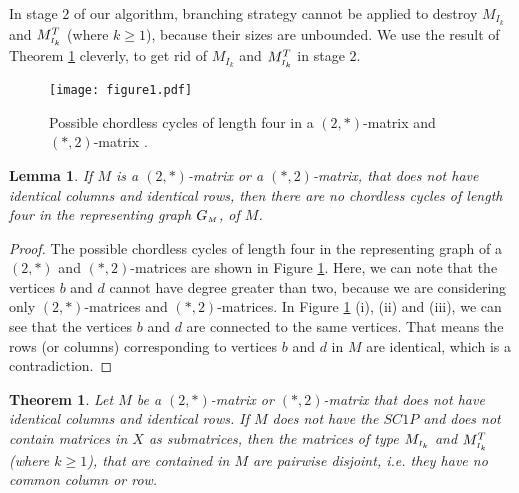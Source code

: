 \documentclass[review, 1p]{elsarticle}
\newtheorem{theorem}{Theorem}
\newtheorem{lemma}{Lemma}
\begin{document}
In stage $2$ of our algorithm, branching strategy cannot be applied to destroy $M_{I_{k}}$ and $M^{T}_{\mathsmaller{I_{k}}}$ (where $k \geq 1$), because their sizes are unbounded. We use the result of Theorem \ref{main} cleverly, to get rid of $M_{I_{k}}$ and $M^{T}_{\mathsmaller{I_{k}}}$ in stage $2$. 
\begin{figure}[t]
\centering
 \texttt{[image: figure1.pdf]}
  \caption{Possible chordless cycles of length four in a $(2,*)$-matrix and $(*,2)$-matrix .\label{chrd}}
\end{figure}
\begin{lemma}\label{chrdl}
If $M$ is a $(2,*)$-matrix or a  $(*,2)$-matrix, that does not have identical columns and identical rows, then there are no chordless cycles of length four in the representing graph $G_{\mathsmaller{M}}$, of $M$.
\end{lemma}
 \begin{proof}
 The possible chordless cycles of length four in the representing graph of a $(2,*)$ and $(*,2)$-matrices are shown in Figure \ref{chrd}. Here, we can note that the vertices $b$ and $d$ cannot have degree greater than two, because we are considering only $(2,*)$-matrices and  $(*,2)$-matrices. In Figure \ref{chrd} (i), (ii) and (iii), we can see that the vertices $b$ and $d$ are connected to the same vertices. That means the rows (or columns) corresponding to vertices $b$ and $d$ in $M$ are identical, which is a contradiction.
\end{proof}
\begin{theorem} \label{main}
Let $M$ be a $(2,*)$-matrix or $(*,2)$-matrix that does not have identical columns and identical rows. If $M$ does not have the $SC1P$  and does not contain matrices in $X$ as submatrices, then the matrices of type $M_{\mathsmaller I_{k}}$ and $M^{T}_{\mathsmaller{I_{k}}}$ (where $k \geq 1$), that are contained in $M$ are pairwise disjoint, i.e. they have no common column or row.
\end{theorem}
\end{document}
